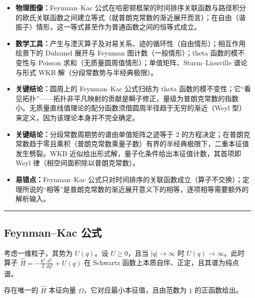 
\begin{keytakeaways}
\begin{itemize}
  \item \textbf{物理图像：}Feynman–Kac 公式在哈密顿框架的时间排序关联函数与路径积分的欧氏关联函数之间建立等式（就普朗克常数的渐近展开而言）；在自由（谐振子）情形，这一等式甚至作为普通函数之间的恒等式成立。
  \item \textbf{数学工具：}产生与湮灭算子及对易关系、迹的循环性（自由情形）；相互作用绘景下的 Duhamel 展开与 Feynman 图计数（一般情形）；theta 函数的模不变性与 Poisson 求和（无质量圆周值情形）；单值矩阵、Sturm–Liouville 谱论与形式 WKB 解（分段常数势与半经典极限）。
  \item \textbf{关键结论：}圆周上的 Feynman–Kac 公式归结为 theta 函数的模不变性；它“看见拓扑”——拓扑非平凡映射的贡献是瞬子修正，量级为普朗克常数的指数小。无质量直线值理论的配分函数须借圆周半径趋于无穷的渐近（Weyl 型）来定义，因为该理论本身并不完全确定。
  \item \textbf{关键结论：}分段常数周期势的谱由单值矩阵之迹等于 2 的方程决定；在普朗克常数趋于零且乘积（普朗克常数乘量子数）有界的半经典极限下，二重本征值发生劈裂。WKB 近似给出形式解，量子化条件给出本征值计数，其首项即 Weyl 律（相空间面积除以普朗克常数）。
  \item \textbf{易错点：}Feynman–Kac 公式只对时间排序的关联函数成立（算子不交换）；定理所说的“相等”是普朗克常数的渐近展开意义下的相等，逐项相等需要额外的解析输入。
\end{itemize}
\end{keytakeaways}

\bigskip
\noindent\rule{\textwidth}{0.6pt}
\bigskip

\subsection{Feynman–Kac 公式}

考虑一维粒子，其势为 $U(q)$。设 $U\ge 0$，且当 $|q|\to \infty$ 时 $U(q)\to \infty$。此时算子 $\widehat H=-\frac{\hbar^2}{2}\frac{d^2}{dq^2}+U(q)$ 在 Schwartz 函数上本质自伴、正定，且其谱为纯点谱。

\begin{lemma}\label{uniqueeig} 存在唯一的 $\widehat H$ 本征向量 $\Omega$，它对应最小本征值，且由范数为 $1$ 的正函数给出。
\end{lemma}

